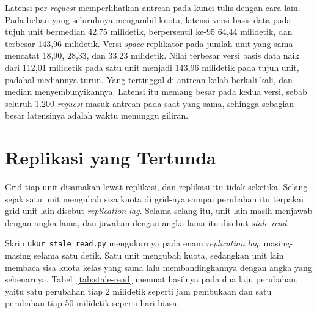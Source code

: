 Latensi per \textit{request} memperlihatkan antrean pada kunci tulis dengan cara
lain. Pada beban yang seluruhnya mengambil kuota, latensi versi basis data pada
tujuh unit bermedian 42,75 milidetik, berpersentil ke-95 64,44 milidetik, dan
terbesar 143,96 milidetik. Versi \textit{space} replikator pada jumlah unit yang
sama mencatat 18,90, 28,33, dan 33,23 milidetik. Nilai terbesar versi basis data
naik dari 112,01 milidetik pada satu unit menjadi 143,96 milidetik pada tujuh
unit, padahal mediannya turun. Yang tertinggal di antrean kalah berkali-kali,
dan median menyembunyikannya. Latensi itu memang besar pada kedua versi,
sebab
seluruh 1.200 \textit{request} masuk antrean pada saat yang sama, sehingga
sebagian besar latensinya adalah waktu menunggu giliran.

\section{Replikasi yang Tertunda}

Grid tiap unit disamakan lewat replikasi, dan replikasi itu tidak seketika.
Selang sejak satu unit mengubah sisa kuota di grid-nya sampai perubahan itu
terpakai grid unit lain disebut \textit{replication
lag}. Selama selang itu, unit
lain masih menjawab dengan angka lama, dan jawaban dengan angka lama itu disebut
\textit{stale read}.

Skrip \texttt{ukur\_stale\_read.py} mengukurnya pada enam \textit{replication lag},
masing-masing selama satu detik. Satu unit mengubah kuota, sedangkan unit lain
membaca sisa kuota kelas yang sama lalu membandingkannya dengan angka yang
sebenarnya. Tabel~\ref{tab:stale-read} memuat hasilnya pada dua laju perubahan,
yaitu satu perubahan tiap 2 milidetik seperti jam pembukaan dan satu perubahan
tiap 50 milidetik seperti hari biasa.

